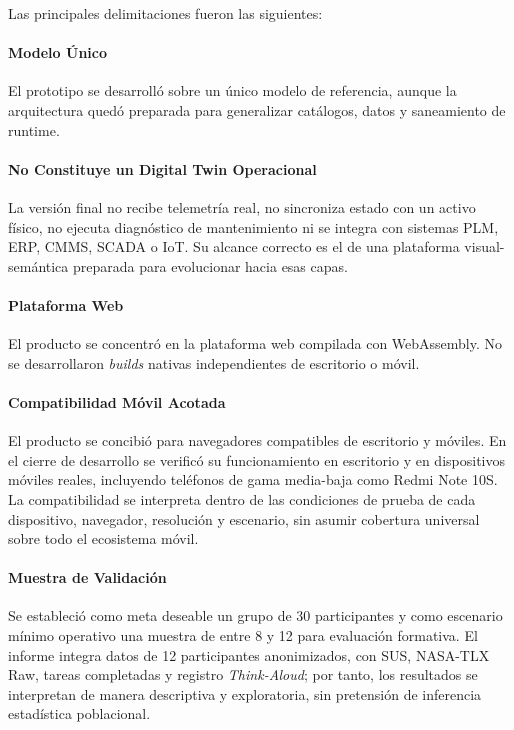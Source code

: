 Las principales delimitaciones fueron las siguientes:

\paragraph{Modelo Único} El prototipo se desarrolló sobre un único modelo de referencia, aunque la arquitectura quedó preparada para generalizar catálogos, datos y saneamiento de runtime.

\paragraph{No Constituye un Digital Twin Operacional} La versión final no recibe telemetría real, no sincroniza estado con un activo físico, no ejecuta diagnóstico de mantenimiento ni se integra con sistemas PLM, ERP, CMMS, SCADA o IoT. Su alcance correcto es el de una plataforma visual-semántica preparada para evolucionar hacia esas capas.

\paragraph{Plataforma Web} El producto se concentró en la plataforma web compilada con WebAssembly. No se desarrollaron \textit{builds} nativas independientes de escritorio o móvil.

\paragraph{Compatibilidad Móvil Acotada} El producto se concibió para navegadores compatibles de escritorio y móviles. En el cierre de desarrollo se verificó su funcionamiento en escritorio y en dispositivos móviles reales, incluyendo teléfonos de gama media-baja como Redmi Note 10S. La compatibilidad se interpreta dentro de las condiciones de prueba de cada dispositivo, navegador, resolución y escenario, sin asumir cobertura universal sobre todo el ecosistema móvil.

\paragraph{Muestra de Validación} Se estableció como meta deseable un grupo de 30 participantes y como escenario mínimo operativo una muestra de entre 8 y 12 para evaluación formativa. El informe integra datos de 12 participantes anonimizados, con SUS, NASA-TLX Raw, tareas completadas y registro \textit{Think-Aloud}; por tanto, los resultados se interpretan de manera descriptiva y exploratoria, sin pretensión de inferencia estadística poblacional.

